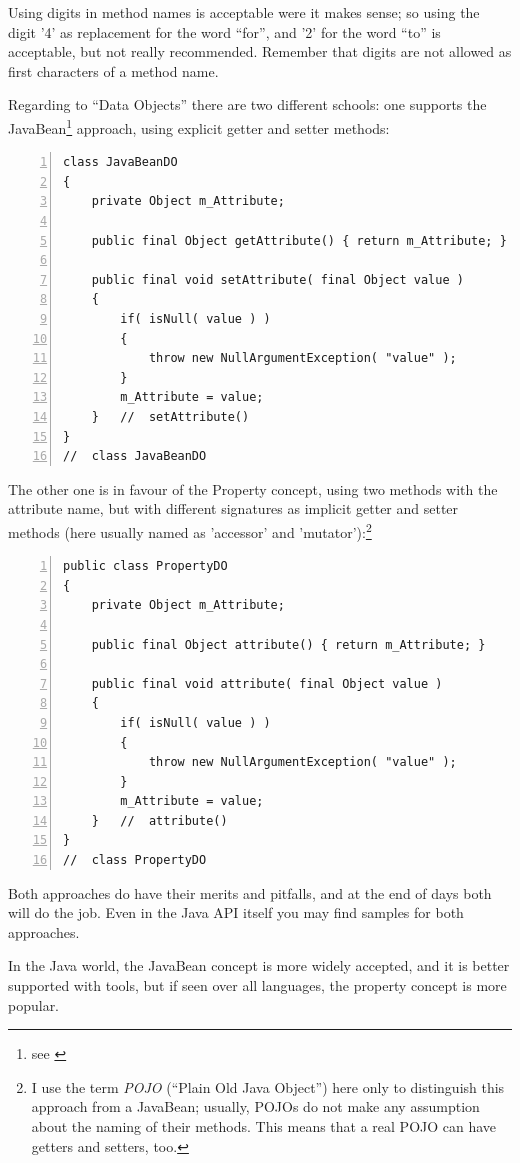 \documentclass[11pt,a4paper, titlepage, parskip=half, headsepline, footsepline, cleardoublepage=current, headheight=1cm]{scrbook}
\begin{document}
Using digits in method names is acceptable were it makes sense; so using the digit '4' as replacement for the word “for”, and '2' for the word “to” is acceptable, but not really recommended. Remember that digits are not allowed as first characters of a method name.

Regarding to “Data Objects” there are two different schools: one supports the JavaBean\footnote{see \autocite{ORACLE_DOC_JAVABEANS}} approach, using explicit getter and setter methods:
\begin{lstlisting}[numbers=left,caption={JavaBean}]
class JavaBeanDO
{
    private Object m_Attribute;

    public final Object getAttribute() { return m_Attribute; }

    public final void setAttribute( final Object value )
    {
        if( isNull( value ) ) 
        {
            throw new NullArgumentException( "value" );
        }
        m_Attribute = value;
    }   //  setAttribute()
}
//  class JavaBeanDO
\end{lstlisting}

The other one is in favour of the Property concept, using two methods with the attribute name, but with different signatures as implicit getter and setter methods (here usually named as 'accessor' and 'mutator'):\footnote{I use the term \textit{POJO} (“Plain Old Java Object”) here only to distinguish this approach from a JavaBean; usually, POJOs do not make any assumption about the naming of their methods. This means that a real POJO can have getters and setters, too.}

\begin{lstlisting}[numbers=left,caption={POJO}]
public class PropertyDO
{
    private Object m_Attribute;

    public final Object attribute() { return m_Attribute; }

    public final void attribute( final Object value )
    {
        if( isNull( value ) ) 
        {
            throw new NullArgumentException( "value" );
        }
        m_Attribute = value;
    }	//	attribute()
}
//  class PropertyDO
\end{lstlisting}

Both approaches do have their merits and pitfalls, and at the end of days both will do the job. Even in the Java API itself you may find samples for both approaches.

In the Java world, the JavaBean concept is more widely accepted, and it is better supported with tools, but if seen over all languages, the property concept is more popular.
\end{document}

